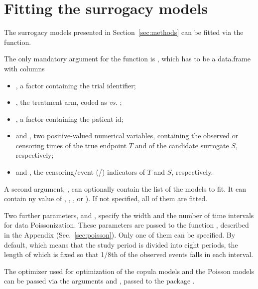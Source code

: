 \documentclass[article,shortnames, nojss]{jss}\usepackage[]{graphicx}\usepackage[]{color}
\begin{document}
\section{Fitting the surrogacy models}
  The surrogacy models presented in Section~\ref{sec:methods}
  can be fitted via the  function.
  
  The only mandatory argument for the  function is
  , which has to be a data.frame with columns
  \begin{itemize}
  \item {}, a factor containing the trial identifier;
  \item {}, the treatment arm, coded as  \textit{vs.} ;
  \item {}, a factor containing the patient id;
  \item {} and , two positive-valued numerical variables,
  containing the observed or censoring times of the true endpoint $T$
  and of the candidate surrogate $S$, respectively;
  \item {} and ,
  the censoring/event (/) indicators of $T$ and $S$, respectively.
  \end{itemize}
  
  A second argument, , can optionally contain the list of the models to fit.
  It can contain  ny value of 
  , , , or ).
  If not specified, all of them are fitted.
  
  Two further parameters,  and ,
  specify the width and the number of time intervals for data Poissonization.
These parameters are passed to the function ,
  described in the Appendix (Sec.~\ref{sec:poisson}).
  Only one of them can be specified.
  By default,  which means that the study period is divided into
  eight periods, the length of which is fixed so that 1/8th of the observed
  events falls in each interval.
  
  The optimizer used for optimization of the copula models and the Poisson models
  can be passed via the arguments  and ,
  passed to the  package \citep{optimxJSS, R:optimx}.
  
\end{document}
